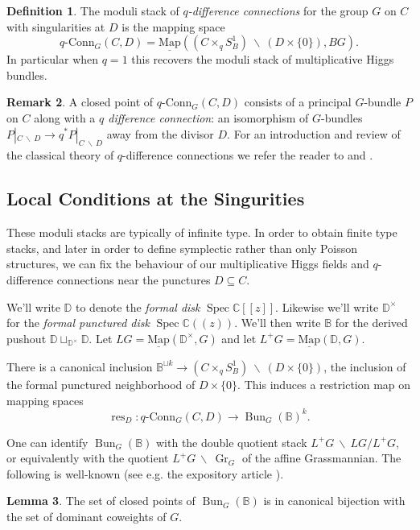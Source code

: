 \documentclass[11pt, oneside, reqno]{amsart}
\theoremstyle{definition} \newtheorem{definition}{Definition}[section]
\newtheorem{lemma}[definition]{Lemma}
\theoremstyle{definition} \newtheorem{remark}[definition]{Remark}
\theoremstyle{definition} \newtheorem{remarks}[definition]{Remarks}
\theoremstyle{definition} \newtheorem{question}[definition]{Question}
\theoremstyle{definition} \newtheorem*{note}{Note}
\theoremstyle{definition} \newtheorem{example}[definition]{Example}
\theoremstyle{definition} \newtheorem{examples}[definition]{Examples}
\newcommand{\bb}[1]{\mathbb{#1}}
\newcommand{\mr}[1]{\mathrm{#1}}
\newcommand{\bs}{\ \backslash \ }
\newcommand{\ul}[1]{\underline{#1}}
\newcommand{\CC}{\mathbb{C}}
\newcommand{\sub}{\subseteq}
\DeclareMathOperator{\bun}{Bun}
\DeclareMathOperator{\Gr}{Gr}
\DeclareMathOperator{\spec}{Spec}
\DeclareMathOperator{\res}{res}
\newcommand{\map}{\ul{\mr{Map}}}
\newcommand{\qconn}{q\text{-Conn}}
\begin{document}
\begin{definition}
The moduli stack of \emph{$q$-difference connections} for the group $G$ on $C$ with singularities at $D$ is the mapping space
\[\qconn_G(C,D) = \map((C \times_q S^1_B) \bs (D \times \{0\}), BG).\] 
In particular when $q=1$ this recovers the moduli stack of multiplicative Higgs bundles.
\end{definition}

\begin{remark}
  A closed point of $\qconn_G(C,D)$ consists of a principal $G$-bundle
  $P$ on $C$ along with a \emph{$q$ difference connection}: an
  isomorphism of $G$-bundles
  $P|_{C \! \bs \! D} \to q^*P|_{C \! \bs \! D}$ away from the divisor
  $D$.  For an introduction and review of the classical theory of $q$-difference
  connections we refer the reader to \cite{STSSevostyanov} and \cite{Sauloy}.
\end{remark}

\subsection{Local Conditions at the Singurities}
These moduli stacks are typically of infinite type.  In order to obtain finite type stacks, and later in order to define symplectic rather than only Poisson structures, we can fix the behaviour of our multiplicative Higgs fields and $q$-difference connections near the punctures $D \sub C$.

We'll write $\bb D$ to denote the \emph{formal disk} $\spec \CC[[z]]$.  Likewise we'll write $\bb D^\times$ for the \emph{formal punctured disk} $\spec \CC(\!(z)\!)$.  We'll then write $\bb B$ for the derived pushout $\bb D \sqcup_{\bb D^\times} \bb D$.  Let $LG = \map(\bb D^\times, G)$ and let $L^+G = \map(\bb D, G)$.

There is a canonical inclusion $\bb B^{\sqcup k} \to (C \times_q S^1_B) \!\!\bs\!\! (D \times \{0\})$, the inclusion of the formal punctured neighborhood of $D \times \{0\}$.  This induces a restriction map on mapping spaces
\[\res_D \colon \qconn_G(C, D) \to \bun_G(\bb B)^k.\]

One can identify $\bun_G(\bb B)$ with the double quotient stack $L^+G \!\bs\! LG / L^+G$, or equivalently with the quotient $L^+G \!\bs\! \Gr_G$ of the affine Grassmannian.  The following is well-known (see e.g. the expository article \cite{Zhu}).

\begin{lemma}
The set of closed points of $\bun_G(\bb B)$ is in canonical bijection with the set of dominant coweights of $G$.
\end{lemma}
\end{document}
